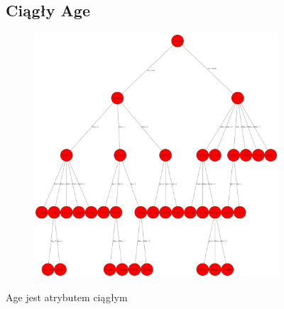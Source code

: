 \documentclass[12pt]{article}
\begin{document}
\clearpage
\begin{figure}[h!]
	\subsection{Ciągły Age}
	\centering
	\begin{subfigure}[b]{1\linewidth}
		\includegraphics[width=\linewidth]{Ciagly.png}
	\end{subfigure}
	\label{fig:ciagle}
	\caption{Age jest atrybutem ciągłym}
\end{figure}
\end{document}
